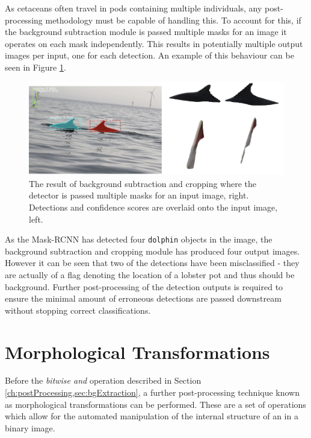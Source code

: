 As cetaceans often travel in pods containing multiple individuals, any post-processing methodology must be capable of handling this. To account for this, if the background subtraction module is passed multiple masks for an image it operates on each mask independently. This results in potentially multiple output images per input, one for each detection. An example of this behaviour can be seen in Figure \ref{fig:fin-extraction-pod-with-flag}.

\begin{figure}[h]
	\begin{center}
		\includegraphics[scale=0.5]{Chapter4/figs/fin-extraction-pod-with-flag.png}
	\end{center}
	\caption{The result of background subtraction and cropping where the detector is passed multiple masks for an input image, right. Detections and confidence scores are overlaid onto the input image, left.}
	\label{fig:fin-extraction-pod-with-flag}
\end{figure}

As the Mask-RCNN has detected four \texttt{dolphin} objects in the image, the background subtraction and cropping module has produced four output images. However it can be seen that two of the detections have been misclassified - they are actually of a flag denoting the location of a lobster pot and thus should be background. Further post-processing of the detection outputs is required to ensure the minimal amount of erroneous detections are passed downstream without stopping correct classifications. 

\section{Morphological Transformations}\label{ch:postProcessing,sec:morphologicalTransformations}

Before the \textit{bitwise and} operation described in Section \ref{ch:postProcessing,sec:bgExtraction}, a further post-processing technique known as morphological transformations can be performed. These are a set of operations which allow for the automated manipulation of the internal structure of an in a binary image. 

